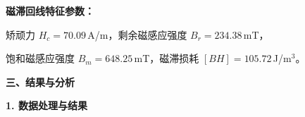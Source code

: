 \documentclass[a4paper,12pt]{article}
\begin{document}
\vspace{0.3cm}

{\fontsize{12pt}{18pt}\selectfont

\textbf{磁滞回线特征参数：}

矫顽力 $H_c = 70.09$\,A/m，剩余磁感应强度 $B_r = 234.38$\,mT，

饱和磁感应强度 $B_m = 648.25$\,mT，磁滞损耗 $[BH] = 105.72$\,J/m$^3$。

}

\newpage

{\fontsize{16pt}{24pt}\selectfont \textbf{三、结果与分析}}

\vspace{0.5cm}
{\fontsize{14pt}{20pt}\selectfont \textbf{1. 数据处理与结果}}

\vspace{0.3cm}
\end{document}

